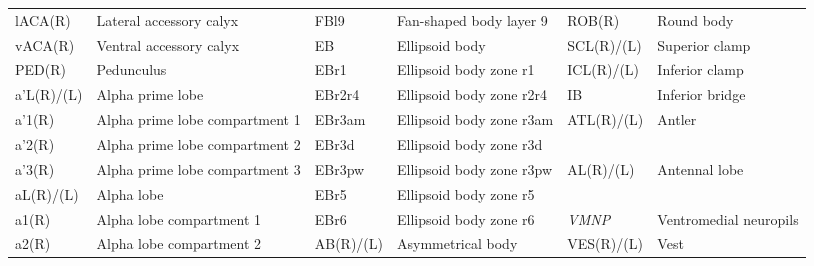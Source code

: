 \documentclass{article}
\begin{document}
\begin{center}
\begin{longtable}{llllll}
\hspace*{0.8em}lACA(R) & Lateral accessory calyx & \hspace*{1.6em}FBl9 & Fan-shaped body layer 9 & \hspace*{1.6em}ROB(R) & Round body \\
\hspace*{0.8em}vACA(R) & Ventral accessory calyx & \hspace*{0.8em}EB & Ellipsoid body & \hspace*{0.8em}SCL(R)/(L) & Superior clamp \\
\hspace*{0.8em}PED(R) & Pedunculus & \hspace*{1.6em}EBr1 & Ellipsoid body zone r1 & \hspace*{0.8em}ICL(R)/(L) & Inferior clamp \\
\hspace*{0.8em}a’L(R)/(L) & Alpha prime lobe & \hspace*{1.6em}EBr2r4 & Ellipsoid body zone r2r4 & \hspace*{0.8em}IB & Inferior bridge \\
\hspace*{1.6em}a’1(R) & Alpha prime lobe compartment 1 & \hspace*{1.6em}EBr3am & Ellipsoid body zone r3am & \hspace*{0.8em}ATL(R)/(L) & Antler \\
\hspace*{1.6em}a’2(R) & Alpha prime lobe compartment 2 & \hspace*{1.6em}EBr3d & Ellipsoid body zone r3d &  &  \\
\hspace*{1.6em}a’3(R) & Alpha prime lobe compartment 3 & \hspace*{1.6em}EBr3pw & Ellipsoid body zone r3pw & AL(R)/(L) & Antennal lobe \\
\hspace*{0.8em}aL(R)/(L) & Alpha lobe & \hspace*{1.6em}EBr5 & Ellipsoid body zone r5 &  &  \\
\hspace*{1.6em}a1(R) & Alpha lobe compartment 1 & \hspace*{1.6em}EBr6 & Ellipsoid body zone r6 & \emph{VMNP} & Ventromedial neuropils \\
\hspace*{1.6em}a2(R) & Alpha lobe compartment 2 & \hspace*{0.8em}AB(R)/(L) & Asymmetrical body & \hspace*{0.8em}VES(R)/(L) & Vest \\

\end{longtable}
\end{center}
\end{document}
